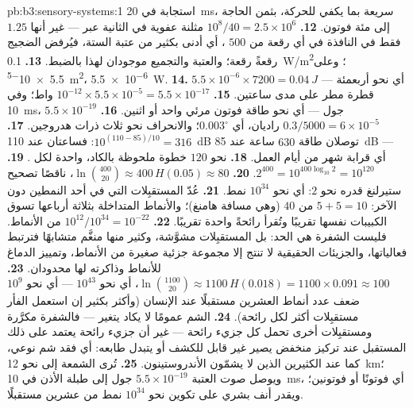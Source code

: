 \begin{solution}{pb:b3:sensory-systems:1}
استجابة في \qty{20}{ms}، سريعة بما يكفي للحركة، بثمن الحاجة
إلى مئة فوتون.
\textbf{12.} $10^{8}/40 = 2.5\times 10^{6}$ مثلنة عفوية في
الثانية عبر  --- غير أنها $1.25$ فقط في النافذة في
أي رقعة من $500$ ، أي أدنى بكثير من عتبة الستة، فيُرفض
الضجيج رقعةً رقعة؛ والعتبة والتجميع موجودان لهذا بالضبط.
\textbf{13.} \qty{0.1}{W/m^2}؛ وعلى \qty{5.5e-5}{m^2}، \qty{5.5e-6}{W}.
\textbf{14.} $5.5\times 10^{-6}\times 7200 = \qty{0.04}{J}$ --- أي نحو
أربعمئة قطرة مطر على مدى ساعتين.
\textbf{15.} $10^{-12}\times 5.5\times 10^{-5} = 5.5\times 10^{-17}$ واط؛
وفي \qty{10}{ms}، $5.5\times 10^{-19}$ جول --- أي نحو طاقة فوتون
مرئي واحد أو اثنين.
\textbf{16.} $0.3/5000 = 6\times 10^{-5}$ راديان، أي $0.003^{\circ}$؛
والانحراف نحو ثلاث ذرات هدروجين.
\textbf{17.} $10^{(110 - 85)/10} = 316$: فساعتان عند \qty{110}{dB}
توصلان طاقة $630$ ساعة عند \qty{85}{dB} --- أي قرابة شهر من
أيام العمل.
\textbf{18.} نحو $120$ خطوة ملحوظة بالكاد، واحدة لكل .
\textbf{19.} $2^{400} = 10^{400\log_{10}2} = 10^{120}$.
\textbf{20.} $\ln\binom{400}{20} \approx 400\,H(0.05) \approx 80$، ناقصًا
تصحيح ستيرلنغ قدره نحو $2$: أي نحو $10^{34}$ نمط.
\textbf{21.} عُدّ المستقبِلات التي في أحد النمطين دون الآخر:
$5 +
5 = 10$ من $40$ (وهي مسافة هامنغ)؛ والأنماط المتداخلة بثلاثة
أرباعها تسوق الكبيبات نفسها تقريبًا وتُقرأ رائحةً واحدة
تقريبًا.
\textbf{22.} $10^{12}/10^{34} = 10^{-22}$ من الأنماط. فليست
الشفرة هي الحد: بل المستقبِلات مشوَّشة، وكثير منها منغَّم
متشابهًا فترتبط فعالياتها، والجزيئات الحقيقية لا تنتج إلا
مجموعة جزئية صغيرة من الأنماط، وتمييز الدماغ للأنماط
وذاكرته لها محدودان.
\textbf{23.} $\ln\binom{1100}{20} \approx 1100\,H(0.018) = 1100\times
0.091 \approx 100$، أي نحو $10^{43}$ --- أي نحو $10^{9}$ ضعف عدد
أنماط العشرين مستقبلًا عند الإنسان (وأكثر بكثير إن استعمل
الفأر مستقبِلات أكثر لكل رائحة).
\textbf{24.} الشم عمومًا لا يكاد يتغير --- فالشفرة مكرَّرة
ومستقبِلات أخرى تحمل كل جزيء رائحة --- غير أن جزيء رائحة
يعتمد على ذلك المستقبل عند تركيز منخفض يصير غير قابل للكشف
أو يتبدل طابعه: أي فقد شم نوعي، كما عند الكثيرين الذين لا
يشمّون الأندروستينون.
\textbf{25.} تُرى الشمعة إلى نحو \qty{12}{km}؛ ويوصل صوت
العتبة $5.5\times 10^{-19}$ جول إلى طبلة الأذن في \qty{10}{ms}،
أي فوتونًا أو فوتونين؛ ويقدر أنف بشري على تكوين نحو
$10^{34}$ نمط من عشرين مستقبلًا.
\end{solution}
